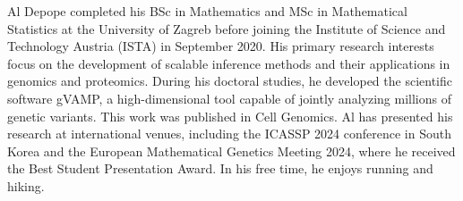 \documentclass[draft,final]{istaustriathesis}
\begin{document}
\begin{aboutauthor}
    Al Depope completed his BSc in Mathematics and MSc in Mathematical Statistics at the University of Zagreb before joining the Institute of Science and Technology Austria (ISTA) in September 2020. His primary research interests focus on the development of scalable inference methods and their applications in genomics and proteomics. During his doctoral studies, he developed the scientific software gVAMP, a high-dimensional tool capable of jointly analyzing millions of genetic variants. This work was published in Cell Genomics. Al has presented his research at international venues, including the ICASSP 2024 conference in South Korea and the European Mathematical Genetics Meeting 2024, where he received the Best Student Presentation Award. In his free time, he enjoys running and hiking.
\end{aboutauthor}
\end{document}
